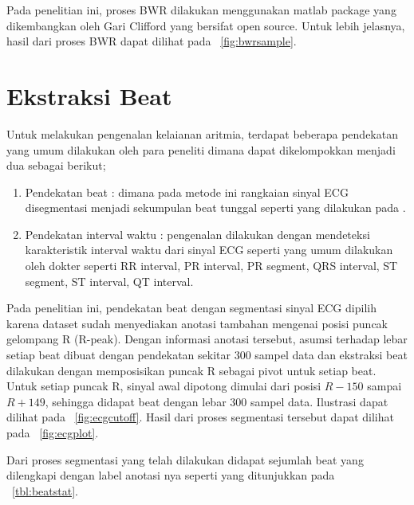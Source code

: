 Pada penelitian ini, proses BWR dilakukan menggunakan matlab package yang
dikembangkan oleh Gari Clifford \cite{Clifford:2005} yang bersifat open source.
Untuk lebih jelasnya, hasil dari proses BWR dapat dilihat pada
\pic~\ref{fig:bwrsample}.

\section{Ekstraksi Beat}
\label{sec:ekstractbeat}
Untuk melakukan pengenalan kelaianan aritmia, terdapat beberapa pendekatan yang
umum dilakukan oleh para peneliti dimana dapat dikelompokkan menjadi dua sebagai
berikut;
\begin{enumerate}
  \item Pendekatan beat : dimana pada metode ini rangkaian sinyal ECG 
  disegmentasi menjadi sekumpulan beat tunggal seperti yang dilakukan pada
  \cite{Zhao:2005, Ghongade:2007}. 
  \item Pendekatan interval waktu : pengenalan dilakukan dengan mendeteksi
  karakteristik interval waktu dari sinyal ECG seperti yang umum
  dilakukan oleh dokter seperti RR interval, PR interval, PR segment, QRS
  interval, ST segment, ST interval, QT interval.
\end{enumerate}


Pada penelitian ini, pendekatan beat dengan segmentasi sinyal ECG dipilih karena
dataset sudah menyediakan anotasi tambahan mengenai posisi puncak gelompang R
(R-peak). Dengan informasi anotasi tersebut, asumsi terhadap lebar setiap beat
dibuat dengan pendekatan sekitar 300 sampel data dan ekstraksi beat dilakukan
dengan memposisikan puncak R sebagai pivot untuk setiap beat. Untuk setiap
puncak R, sinyal awal dipotong dimulai dari posisi $R-150$ sampai $R+149$,
sehingga didapat beat dengan lebar 300 sampel data. Ilustrasi dapat dilihat pada
\pic~\ref{fig:ecgcutoff}. Hasil dari proses segmentasi tersebut dapat dilihat
pada \pic~\ref{fig:ecgplot}.


Dari proses segmentasi yang telah dilakukan didapat sejumlah beat yang
dilengkapi dengan label anotasi nya seperti yang ditunjukkan pada
\tab~\ref{tbl:beatstat}.


